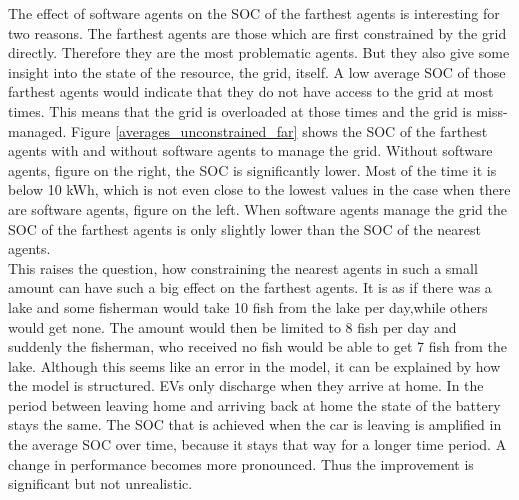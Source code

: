 \documentclass[a4paper]{article}
\begin{document}
The effect of software agents on the SOC of the farthest agents is interesting for two reasons. The farthest agents are those which 
are first constrained by the grid directly. Therefore they are the most problematic agents. But they also give some insight into 
the state of the resource, the grid, itself. A low average SOC of those farthest agents would indicate that they do not have access to 
the grid at most times. This means that the grid is overloaded at those times and the grid is miss-managed. Figure
\ref{averages_unconstrained_far} shows the SOC of the farthest agents with and without software agents to manage the grid. Without 
software agents, figure on the right, the SOC is significantly lower. Most of the time it is below 10 kWh, which is not even close to 
the lowest values in the case when there are software agents, figure on the left. When software agents manage the grid the SOC of the 
farthest agents is only slightly lower than the SOC of the nearest agents. \\
This raises the question, how constraining the nearest
agents in such a small amount can have such a big effect on the farthest agents.
It is as if there was a lake and some fisherman would take 
10 fish from the lake per day,while others would get none. The amount would then be limited to 8 fish per day and suddenly 
the fisherman, who received no fish would be able to get 7 fish from the lake.
Although this seems like an error in the model, it can 
be explained by how the model is structured. EVs only discharge when they arrive at home. In the period between leaving home and 
arriving back at home the state of the battery stays the same. The SOC that is achieved  when the car is leaving is amplified in the 
average SOC over time, because it stays that way for a longer time period. A change in performance becomes more pronounced. Thus the 
improvement is significant but not unrealistic. 
\end{document}
